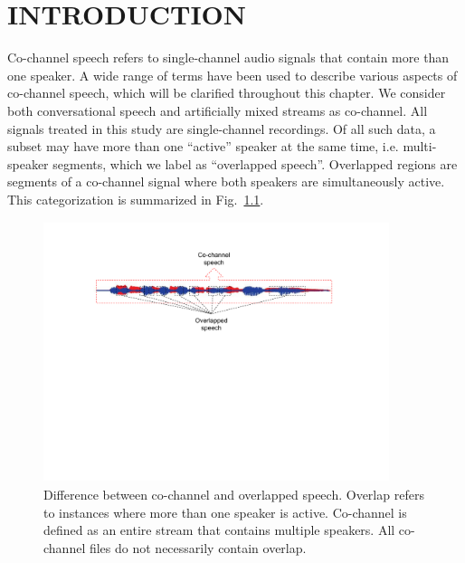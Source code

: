 
\chapter{INTRODUCTION}

Co-channel speech refers to single-channel audio signals that contain more than one speaker. 
A wide range of terms have been used to describe various aspects of co-channel speech, 
which will be clarified throughout this chapter. 
We consider both conversational speech and artificially mixed streams as co-channel. 
All signals treated in this study are single-channel recordings. 
Of all such data, a subset may have more than one ``active'' speaker at the same time, i.e. multi-speaker segments, 
which we label as ``overlapped speech''. 
Overlapped regions are segments of a co-channel signal where both speakers are simultaneously active. This categorization is summarized in Fig.~\ref{fig:cochannel_vs_overlap}.

\begin{figure}[h!]
	\centering
	\vspace{0mm}
	\includegraphics[height = 3in, width=0.9\textwidth]{figures/cochannel_vs_overlap-crop}
	\vspace{-3mm}
	\caption{Difference between co-channel and overlapped speech. Overlap refers to instances where more than one speaker is active. Co-channel is defined as an entire stream that contains multiple speakers. All co-channel files do not necessarily contain overlap. }
	\label{fig:cochannel_vs_overlap}
	\vspace{-3mm}
\end{figure}



